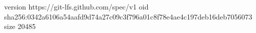 version https://git-lfs.github.com/spec/v1
oid sha256:0342a6106a54aafd9d74a27c09c3f796a01c8f78e4ae4c197deb16deb7056073
size 20485
